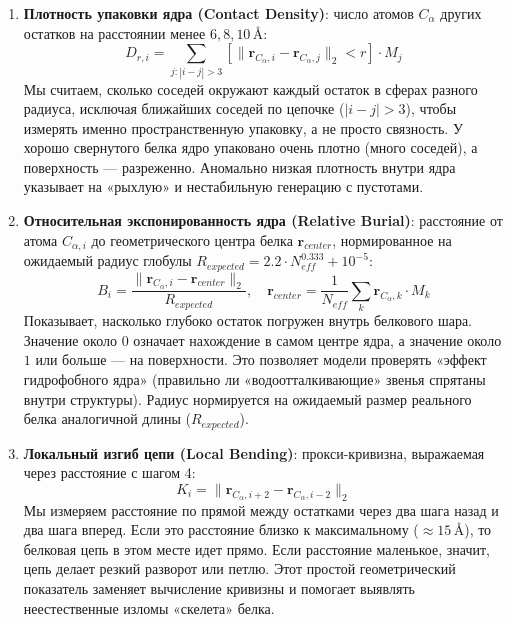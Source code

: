 \documentclass[12pt, a4paper]{article}
\begin{document}
\begin{enumerate}
    \item \textbf{Плотность упаковки ядра (Contact Density)}: число атомов $C_\alpha$ других остатков на расстоянии менее $6, 8, 10\,\text{\AA}$:
    \begin{equation}
        D_{r, i} = \sum_{j: |i-j| > 3} [\|\mathbf{r}_{C_\alpha, i} - \mathbf{r}_{C_\alpha, j}\|_2 < r] \cdot M_j
    \end{equation}
    Мы считаем, сколько соседей окружают каждый остаток в сферах разного радиуса, исключая ближайших соседей по цепочке ($|i-j| > 3$), чтобы измерять именно пространственную упаковку, а не просто связность. У хорошо свернутого белка ядро упаковано очень плотно (много соседей), а поверхность — разреженно. Аномально низкая плотность внутри ядра указывает на «рыхлую» и нестабильную генерацию с пустотами.

    \item \textbf{Относительная экспонированность ядра (Relative Burial)}: расстояние от атома $C_{\alpha, i}$ до геометрического центра белка $\mathbf{r}_{center}$, нормированное на ожидаемый радиус глобулы $R_{expected} = 2.2 \cdot N_{eff}^{0.333} + 10^{-5}$:
    \begin{equation}
        B_i = \frac{\|\mathbf{r}_{C_\alpha, i} - \mathbf{r}_{center}\|_2}{R_{expected}}, \quad \mathbf{r}_{center} = \frac{1}{N_{eff}}\sum_k \mathbf{r}_{C_\alpha, k} \cdot M_k
    \end{equation}
    Показывает, насколько глубоко остаток погружен внутрь белкового шара. Значение около $0$ означает нахождение в самом центре ядра, а значение около $1$ или больше — на поверхности. Это позволяет модели проверять «эффект гидрофобного ядра» (правильно ли «водоотталкивающие» звенья спрятаны внутри структуры). Радиус нормируется на ожидаемый размер реального белка аналогичной длины ($R_{expected}$).

    \item \textbf{Локальный изгиб цепи (Local Bending)}: прокси-кривизна, выражаемая через расстояние с шагом 4:
    \begin{equation}
        K_i = \|\mathbf{r}_{C_\alpha, i+2} - \mathbf{r}_{C_\alpha, i-2}\|_2
    \end{equation}
    Мы измеряем расстояние по прямой между остатками через два шага назад и два шага вперед. Если это расстояние близко к максимальному ($\approx 15\,\text{\AA}$), то белковая цепь в этом месте идет прямо. Если расстояние маленькое, значит, цепь делает резкий разворот или петлю. Этот простой геометрический показатель заменяет вычисление кривизны и помогает выявлять неестественные изломы «скелета» белка.


\end{enumerate}
\end{document}

